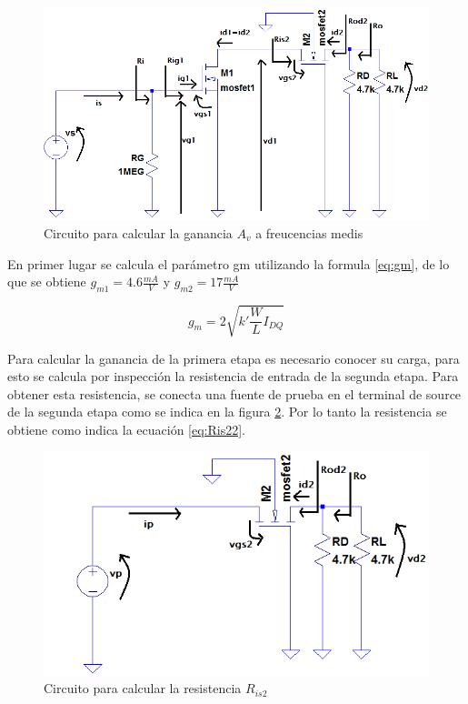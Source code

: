 \documentclass[10pt,spanish,a4paper,notitlepage]{article}
\begin{document}
\begin{figure}[H]
\centering
\includegraphics[scale=0.7]{circuitos/senalanalitico.png}
\caption{Circuito para calcular la ganancia $A_v$ a freucencias medis}
\label{fig:senalanalitico}
\end{figure}

En primer lugar se calcula el parámetro gm utilizando la formula \ref{eq:gm}, de lo que se obtiene ${g_{m1}}=4.6\unit{\frac{mA}{V}}$ y ${g_{m2}}=17\unit{\frac{mA}{V}}$

\begin{equation}
     g_m=2\sqrt{k' \frac{W}{L} I_{DQ}}
    \label{eq:gm}
\end{equation}

Para calcular la ganancia de la primera etapa es necesario conocer su carga, para esto se calcula por inspección la resistencia de entrada de la segunda etapa. Para obtener esta resistencia, se conecta una fuente de prueba en el terminal de source de la segunda etapa como se indica en la figura \ref{fig:Ris2}. Por lo tanto la resistencia se obtiene como indica la ecuación \ref{eq:Ris22}.


\begin{figure}[H]
\centering
\includegraphics[scale=0.7]{circuitos/Ris2.png}
\caption{Circuito para calcular la resistencia $R_{is2}$}
\label{fig:Ris2}
\end{figure}
\end{document}
